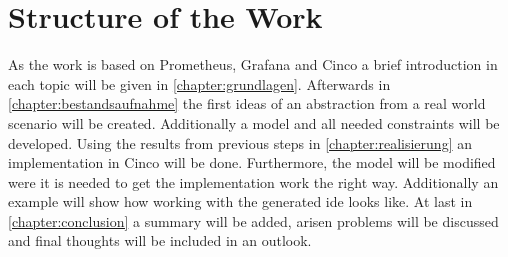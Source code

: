 \section{Structure of the Work}
As the work is based on Prometheus, Grafana and Cinco a brief introduction in each topic will be given in \autoref{chapter:grundlagen}. Afterwards in \autoref{chapter:bestandsaufnahme} the first ideas of an abstraction from a real world scenario will be created. Additionally a model and all needed constraints will be developed. Using the results from previous steps in \autoref{chapter:realisierung} an implementation in Cinco will be done. Furthermore, the model will be modified were it is needed to get the implementation work the right way. Additionally an example will show how working with the generated \gls{ide} looks like. At last in \autoref{chapter:conclusion} a summary will be added, arisen problems will be discussed and final thoughts will be included in an outlook.